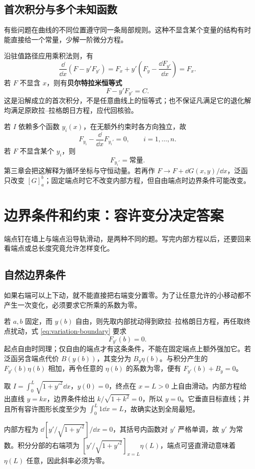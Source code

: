 \subsection{首次积分与多个未知函数}
有些问题在曲线的不同位置遵守同一条局部规则。这种不显含某个变量的结构有时能直接给一个常量，少解一阶微分方程。

沿驻值路径应用乘积法则，有
\[
\frac{\dd}{\dd x}(F-y'F_{y'})
=F_x+y'\left(F_y-\frac{\dd F_{y'}}{\dd x}\right)=F_x.
\]
若 $F$ 不显含 $x$，则有\textbf{贝尔特拉米恒等式}
\begin{equation}\label{eq:beltrami}
F-y'F_{y'}=C.
\end{equation}
这是沿解成立的首次积分，不是任意曲线上的恒等式；也不保证凡满足它的退化解均满足原欧拉--拉格朗日方程，应代回核验。

若 $I$ 依赖多个函数 $y_i(x)$，在无额外约束时各方向独立，故
\begin{equation}\label{eq:el-multi}
F_{y_i}-\frac{\dd}{\dd x}F_{y_i'}=0,\qquad i=1,\ldots,n.
\end{equation}
若 $F$ 不显含某个 $y_i$，则
\begin{equation}\label{eq:cyclic}
F_{y_i'}=\text{常量}.
\end{equation}
第三章会把这解释为循环坐标与守恒动量。若再作 $F\to F+\dd G(x,y)/\dd x$，泛函只改变 $[G]_a^b$；固定端点时它不改变内部方程，但自由端点时边界条件可能改变。

\section{边界条件和约束：容许变分决定答案}
端点钉在墙上与端点沿导轨滑动，是两种不同的题。写完内部方程以后，还要回来看端点或总长度究竟允许怎样变化。

\subsection{自然边界条件}
如果右端可以上下动，就不能直接把右端变分置零。为了让任意允许的小移动都不产生一次变化，必须要求它所乘的系数为零。

若 $a,b$ 固定，而 $y(b)$ 自由，则先取内部扰动得到欧拉--拉格朗日方程，再任取终点扰动，式 \eqref{eq:variation-boundary} 要求
\begin{equation}\label{eq:natural-bc}
F_{y'}(b)=0.
\end{equation}
起点自由时同理；仅自由的端点才有这条条件，不能在固定端点上额外强加它。若泛函另含端点代价 $B(y(b))$，其变分为 $B_y\eta(b)$。与积分产生的 $F_{y'}(b)\eta(b)$ 相加，再令任意的 $\eta(b)$ 的系数为零，便有 $F_{y'}(b)+B_y=0$。
\begin{example}[到一条竖直直线的最短距离]
取 $I=\int_0^L\sqrt{1+y'^2}\dd x$，$y(0)=0$，终点在 $x=L>0$ 上自由滑动。内部方程给出直线 $y=kx$，边界条件给出 $k/\sqrt{1+k^2}=0$，所以 $y=0$。它垂直目标直线；并且所有容许图形长度至少为 $\int_0^L1\dd x=L$，故确实达到全局最短。

内部方程为 $\dd[y'/\sqrt{1+y'^2}]/\dd x=0$，其括号内函数对 $y'$ 严格单调，故 $y'$ 为常数。积分分部的右端项为 $[y'/\sqrt{1+y'^2}]_{x=L}\eta(L)$，端点可竖直滑动意味着 $\eta(L)$ 任意，因此斜率必须为零。
\end{example}

